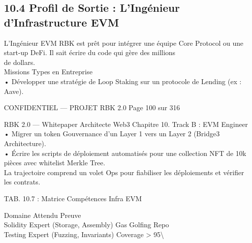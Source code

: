 \subsection{10.4 Profil de Sortie : L’Ingénieur d’Infrastructure EVM}
L’Ingénieur EVM RBK est prêt pour intégrer une équipe Core Protocol ou une start-up DeFi. Il sait écrire du code qui gère des millions\\
de dollars.\\
\vspace{0.5em}
Missions Types en Entreprise\\
\vspace{0.5em}
• Développer une stratégie de Loop Staking sur un protocole de Lending (ex : Aave).\\
\vspace{0.5em}
\vspace{0.5em}
\begin{confidential}CONFIDENTIEL — PROJET RBK 2.0                                Page 100 sur 316\end{confidential}
RBK 2.0 — Whitepaper Architecte Web3                                                                                       Chapitre 10. Track B : EVM Engineer\\
\vspace{0.5em}
\vspace{0.5em}
• Migrer un token Gouvernance d’un Layer 1 vers un Layer 2 (Bridge3 Architecture).\\
\vspace{0.5em}
• Écrire les scripts de déploiement automatisés pour une collection NFT de 10k pièces avec whitelist Merkle Tree.\\
\vspace{0.5em}
La trajectoire comprend un volet Ops pour fiabiliser les déploiements et vérifier les contrats.\\
\vspace{0.5em}
\begin{center}\begin{tabular}TAB. 10.7 : Matrice Compétences Infra EVM\end{tabular}\end{center}
\vspace{0.5em}
\vspace{0.5em}
Domaine Attendu                       Preuve\\
Solidity Expert (Storage, Assembly) Gas Golfing Repo\\
Testing  Expert (Fuzzing, Invariants) Coverage \textgreater{} 95\textbackslash{}%
